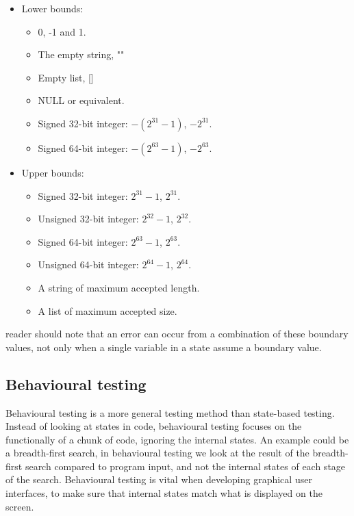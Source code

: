 \documentclass[11pt,a4paper,twoside]{article}
\begin{document}
\begin{itemize}
    \item Lower bounds:
    \begin{itemize}
        \item 0, -1 and 1.
        \item The empty string, ""
        \item Empty list, []
        \item NULL or equivalent.
        \item Signed 32-bit integer: $-(2^{31}-1)$, $-2^{31}$.
        \item Signed 64-bit integer: $-(2^{63}-1)$, $-2^{63}$.
    \end{itemize}
    \item Upper bounds:
    \begin {itemize}
        \item Signed 32-bit integer: $2^{31}-1$, $2^{31}$.
        \item Unsigned 32-bit integer: $2^{32}-1$, $2^{32}$.
        \item Signed 64-bit integer: $2^{63}-1$, $2^{63}$.
        \item Unsigned 64-bit integer: $2^{64}-1$, $2^{64}$.
        \item A string of maximum accepted length.
        \item A list of maximum accepted size.
    \end{itemize}
\end{itemize}

 reader should note that an error can occur from a combination of
these boundary values, not only when a single variable in a state assume a
boundary value.

\subsection{Behavioural testing}

Behavioural testing is a more general testing method than state-based testing.
Instead of looking at states in code, behavioural testing focuses on the
functionally of a chunk of code, ignoring the internal states. An example could
be a breadth-first search, in behavioural testing we look at the result of the
breadth-first search compared to program input, and not the internal states of
each stage of the search. Behavioural testing is vital when developing
graphical user interfaces, to make sure that internal states match what is
displayed on the screen.
\end{document}
